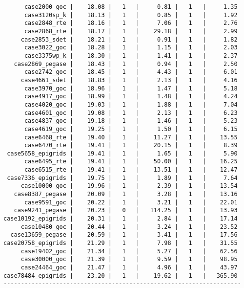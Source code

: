 \begin{verbatim}
      case2000_goc |    18.08 |   1   |     0.81 |   1   |     1.35
      case3120sp_k |    18.13 |   1   |     0.85 |   1   |     1.92
      case2848_rte |    18.16 |   1   |     7.06 |   1   |     2.76
      case2868_rte |    18.17 |   1   |    29.18 |   1   |     2.99
     case2853_sdet |    18.21 |   1   |     0.91 |   1   |     1.82
      case3022_goc |    18.28 |   1   |     1.15 |   1   |     2.03
      case3375wp_k |    18.30 |   1   |     1.41 |   1   |     2.37
   case2869_pegase |    18.43 |   1   |     0.94 |   1   |     2.50
      case2742_goc |    18.45 |   1   |     4.43 |   1   |     6.01
     case4661_sdet |    18.83 |   1   |     2.13 |   1   |     4.16
      case3970_goc |    18.96 |   1   |     1.47 |   1   |     5.18
      case4917_goc |    18.99 |   1   |     1.48 |   1   |     4.24
      case4020_goc |    19.03 |   1   |     1.88 |   1   |     7.04
      case4601_goc |    19.08 |   1   |     2.13 |   1   |     6.23
      case4837_goc |    19.18 |   1   |     1.46 |   1   |     5.23
      case4619_goc |    19.25 |   1   |     1.50 |   1   |     6.15
      case6468_rte |    19.40 |   1   |    11.27 |   1   |    13.55
      case6470_rte |    19.41 |   1   |    20.15 |   1   |     8.39
 case5658_epigrids |    19.41 |   1   |     1.65 |   1   |     5.90
      case6495_rte |    19.41 |   1   |    50.00 |   1   |    16.25
      case6515_rte |    19.41 |   1   |    13.51 |   1   |    12.47
 case7336_epigrids |    19.75 |   1   |     1.89 |   1   |     7.64
     case10000_goc |    19.96 |   1   |     2.39 |   1   |    13.54
   case8387_pegase |    20.09 |   1   |     3.28 |   1   |    13.16
      case9591_goc |    20.22 |   1   |     3.21 |   1   |    22.01
   case9241_pegase |    20.23 |   0   |   114.25 |   1   |    13.93
case10192_epigrids |    20.31 |   1   |     2.84 |   1   |    17.14
     case10480_goc |    20.44 |   1   |     3.24 |   1   |    23.52
  case13659_pegase |    20.59 |   1   |     3.41 |   1   |    17.56
case20758_epigrids |    21.29 |   1   |     7.98 |   1   |    31.55
     case19402_goc |    21.34 |   1   |     5.27 |   1   |    62.56
     case30000_goc |    21.39 |   1   |     9.59 |   1   |    98.95
     case24464_goc |    21.47 |   1   |     4.96 |   1   |    43.97
case78484_epigrids |    23.20 |   1   |    19.62 |   1   |   365.90
--------------------------------------------------------------------
\end{verbatim}
    
